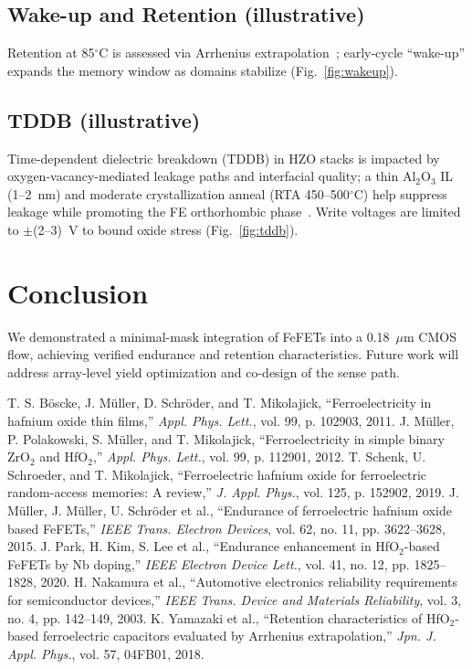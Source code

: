 \documentclass[conference]{IEEEtran}
\begin{document}
\subsection{Wake-up and Retention (illustrative)}
Retention at 85$^\circ$C is assessed via Arrhenius extrapolation~\cite{Yamazaki2018}; early-cycle “wake-up” expands the memory window as domains stabilize (Fig.~\ref{fig:wakeup}).

\subsection{TDDB (illustrative)}
Time-dependent dielectric breakdown (TDDB) in HZO stacks is impacted by oxygen-vacancy-mediated leakage paths and interfacial quality; a thin Al$_2$O$_3$ IL (1--2~nm) and moderate crystallization anneal (RTA 450--500$^\circ$C) help suppress leakage while promoting the FE orthorhombic phase~\cite{Mueller2015,Park2020}. Write voltages are limited to $\pm$(2--3)~V to bound oxide stress (Fig.~\ref{fig:tddb}).

\section{Conclusion}
We demonstrated a minimal-mask integration of FeFETs into a 0.18~$\mu$m CMOS flow, achieving verified endurance and retention characteristics. Future work will address array-level yield optimization and co-design of the sense path.

\begin{thebibliography}{8}
T. S. Böscke, J. Müller, D. Schröder, and T. Mikolajick, ``Ferroelectricity in hafnium oxide thin films,'' \emph{Appl. Phys. Lett.}, vol. 99, p. 102903, 2011.
J. Müller, P. Polakowski, S. Müller, and T. Mikolajick, ``Ferroelectricity in simple binary ZrO$_2$ and HfO$_2$,'' \emph{Appl. Phys. Lett.}, vol. 99, p. 112901, 2012.
T. Schenk, U. Schroeder, and T. Mikolajick, ``Ferroelectric hafnium oxide for ferroelectric random-access memories: A review,'' \emph{J. Appl. Phys.}, vol. 125, p. 152902, 2019.
J. Müller, J. Müller, U. Schröder et al., ``Endurance of ferroelectric hafnium oxide based FeFETs,'' \emph{IEEE Trans. Electron Devices}, vol. 62, no. 11, pp. 3622--3628, 2015.
J. Park, H. Kim, S. Lee et al., ``Endurance enhancement in HfO$_2$-based FeFETs by Nb doping,'' \emph{IEEE Electron Device Lett.}, vol. 41, no. 12, pp. 1825--1828, 2020.
H. Nakamura et al., ``Automotive electronics reliability requirements for semiconductor devices,'' \emph{IEEE Trans. Device and Materials Reliability}, vol. 3, no. 4, pp. 142--149, 2003.
K. Yamazaki et al., ``Retention characteristics of HfO$_2$-based ferroelectric capacitors evaluated by Arrhenius extrapolation,'' \emph{Jpn. J. Appl. Phys.}, vol. 57, 04FB01, 2018.
\end{thebibliography}
\end{document}
